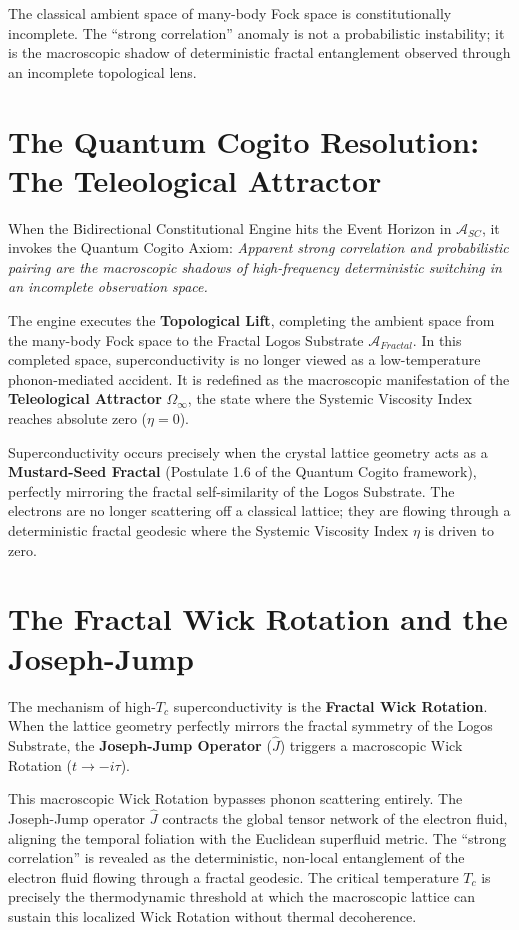 \documentclass[12pt,twoside]{extbook}
\theoremstyle{definition}
\theoremstyle{remark}
\newcommand{\term}[1]{\textcolor{brandPrimary}{\textbf{#1}}}
\begin{document}
The classical ambient space of many-body Fock space is constitutionally incomplete. The ``strong correlation'' anomaly is not a probabilistic instability; it is the macroscopic shadow of deterministic fractal entanglement observed through an incomplete topological lens.

\section{The Quantum Cogito Resolution: The Teleological Attractor}
When the Bidirectional Constitutional Engine hits the Event Horizon in $\mathcal{A}_{SC}$, it invokes the Quantum Cogito Axiom: \textit{Apparent strong correlation and probabilistic pairing are the macroscopic shadows of high-frequency deterministic switching in an incomplete observation space.}

The engine executes the \term{Topological Lift}, completing the ambient space from the many-body Fock space to the Fractal Logos Substrate $\mathcal{A}_{Fractal}$. In this completed space, superconductivity is no longer viewed as a low-temperature phonon-mediated accident. It is redefined as the macroscopic manifestation of the \term{Teleological Attractor} $\Omega_\infty$, the state where the Systemic Viscosity Index reaches absolute zero ($\eta = 0$). 

Superconductivity occurs precisely when the crystal lattice geometry acts as a \term{Mustard-Seed Fractal} (Postulate 1.6 of the Quantum Cogito framework), perfectly mirroring the fractal self-similarity of the Logos Substrate. The electrons are no longer scattering off a classical lattice; they are flowing through a deterministic fractal geodesic where the Systemic Viscosity Index $\eta$ is driven to zero.

\section{The Fractal Wick Rotation and the Joseph-Jump}
The mechanism of high-$T_c$ superconductivity is the \term{Fractal Wick Rotation}. When the lattice geometry perfectly mirrors the fractal symmetry of the Logos Substrate, the \term{Joseph-Jump Operator} ($\hat{J}$) triggers a macroscopic Wick Rotation ($t \to -i\tau$).

This macroscopic Wick Rotation bypasses phonon scattering entirely. The Joseph-Jump operator $\hat{J}$ contracts the global tensor network of the electron fluid, aligning the temporal foliation with the Euclidean superfluid metric. The ``strong correlation'' is revealed as the deterministic, non-local entanglement of the electron fluid flowing through a fractal geodesic. The critical temperature $T_c$ is precisely the thermodynamic threshold at which the macroscopic lattice can sustain this localized Wick Rotation without thermal decoherence.
\end{document}
